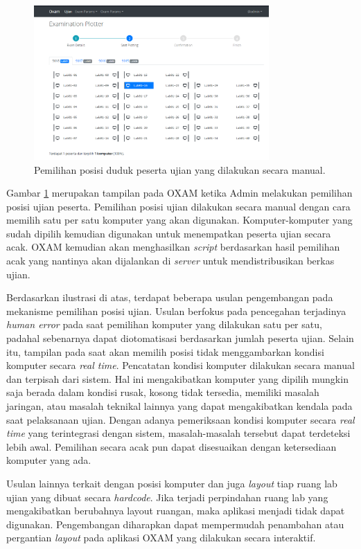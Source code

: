 \documentclass[a4paper,twoside]{article}
\begin{document}
\begin{figure}
    \centering
    \includegraphics[width=0.8\textwidth]{images/seat-plotting.PNG}
    \caption{Pemilihan posisi duduk peserta ujian yang dilakukan secara manual.}
    \label{fig:seat-plotting}
\end{figure}

Gambar \ref{fig:seat-plotting} merupakan tampilan pada OXAM ketika Admin melakukan pemilihan posisi ujian peserta. Pemilihan posisi ujian dilakukan secara manual dengan cara memilih satu per satu komputer yang akan digunakan. Komputer-komputer yang sudah dipilih kemudian digunakan untuk menempatkan peserta ujian secara acak. OXAM kemudian akan menghasilkan \textit{script} berdasarkan hasil pemilihan acak yang nantinya akan dijalankan di \textit{server} untuk mendistribusikan berkas ujian. 

Berdasarkan ilustrasi di atas, terdapat beberapa usulan pengembangan pada mekanisme pemilihan posisi ujian. Usulan berfokus pada pencegahan terjadinya \textit{human error} pada saat pemilihan komputer yang dilakukan satu per satu, padahal sebenarnya dapat diotomatisasi berdasarkan jumlah peserta ujian. Selain itu, tampilan pada saat akan memilih posisi tidak menggambarkan kondisi komputer secara \textit{real time}. Pencatatan kondisi komputer dilakukan secara manual dan terpisah dari sistem. Hal ini mengakibatkan komputer yang dipilih mungkin saja berada dalam kondisi rusak, kosong tidak tersedia, memiliki masalah jaringan, atau masalah teknikal lainnya yang dapat mengakibatkan kendala pada saat pelaksanaan ujian. Dengan adanya pemeriksaan kondisi komputer secara \textit{real time} yang terintegrasi dengan sistem, masalah-masalah tersebut dapat terdeteksi lebih awal. Pemilihan secara acak pun dapat disesuaikan dengan ketersediaan komputer yang ada.

Usulan lainnya terkait dengan posisi komputer dan juga \textit{layout} tiap ruang lab ujian yang dibuat secara \textit{hardcode}. Jika terjadi perpindahan ruang lab yang mengakibatkan berubahnya layout ruangan, maka aplikasi menjadi tidak dapat digunakan. Pengembangan diharapkan dapat mempermudah penambahan atau pergantian \textit{layout} pada aplikasi OXAM yang dilakukan secara interaktif.
\end{document}
